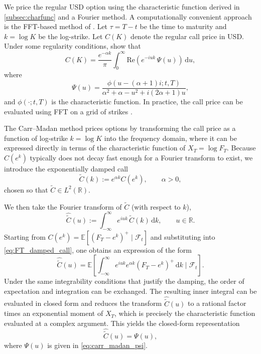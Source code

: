 \documentclass[a4paper,titlepage,12pt]{report}
\theoremstyle{plain}
\begin{document}
We price the regular USD option using the characteristic function derived in \ref{subsec:charfunc} and a Fourier method. A computationally convenient approach is the FFT-based method of \citet{CarrMadan1999}. Let $\tau=T-t$ be the time to maturity and $k=\log K$ be the log-strike. Let $C(K)$ denote the regular call price in USD. Under some regularity conditions, \citet{CarrMadan1999} show that
\begin{equation}
C(K)
=
\frac{e^{-\alpha k}}{\pi}
\int_{0}^{\infty}
\mathrm{Re}\!\left(
e^{-i u k}\,
\Psi(u)
\right)\,\mathrm{d}u,
\label{eq:carr_madan_call}
\end{equation}
where
\begin{equation}
\Psi(u)
=
\frac{\phi\!\left(u-(\alpha+1)i; t,T\right)}
{\alpha^2+\alpha-u^2 + i(2\alpha+1)u},
\label{eq:carr_madan_psi}
\end{equation}
and $\phi(\cdot;t,T)$ is the characteristic function. In practice, the call price can be evaluated using FFT on a grid of strikes \citep{CarrMadan1999}. 

The Carr--Madan method prices options by transforming the call price as a function of log-strike
$k=\log K$ into the frequency domain, where it can be expressed directly in terms of the
characteristic function of $X_T=\log F_T$. Because $C(e^k)$ typically does not decay fast enough for a
Fourier transform to exist, we introduce the exponentially damped call
\[
\widetilde C(k):=e^{\alpha k}C(e^k),\qquad \alpha>0,
\]
chosen so that $\widetilde C\in L^2(\mathbb{R})$.

We then take the Fourier transform of $\widetilde C$ (with respect to $k$),
\begin{equation}
\widehat{\widetilde C}(u)
:=
\int_{-\infty}^{\infty} e^{iuk}\,\widetilde C(k)\,\mathrm{d}k,
\qquad u\in\mathbb{R}.
\label{eq:FT_damped_call}
\end{equation}
Starting from $C(e^k)=\mathbb{E}[(F_T-e^k)^+\mid\mathcal F_t]$ and substituting into
\eqref{eq:FT_damped_call}, one obtains an expression of the form
\[
\widehat{\widetilde C}(u)
=
\mathbb{E}\!\left[\int_{-\infty}^{\infty} e^{iuk}e^{\alpha k}(F_T-e^k)^+\,\mathrm{d}k\;\Big|\;\mathcal F_t\right].
\]
Under the same integrability conditions that justify the damping, the order of expectation and
integration can be exchanged. The resulting inner integral can be evaluated in closed form and
reduces the transform $\widehat{\widetilde C}(u)$ to a rational factor times an exponential moment
of $X_T$, which is precisely the characteristic function evaluated at a complex argument. This yields
the closed-form representation
\begin{equation}
\widehat{\widetilde C}(u)=\Psi(u),
\label{eq:FT_equals_Psi}
\end{equation}
where $\Psi(u)$ is given in \eqref{eq:carr_madan_psi}.
\end{document}

